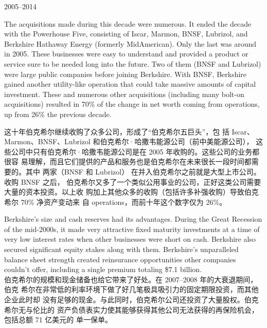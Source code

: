 \begin{section}{2005--2014}
\begin{verseparallel}
  {
    The acquisitions made during this decade were numerous. It ended the decade
    with the Powerhouse Five, consisting of Iscar, Marmon, BNSF, Lubrizol, and
    Berkshire Hathaway Energy (formerly MidAmerican). Only the last was around
    in 2005. These businesses were easy to understand and provided a product or
    service sure to be needed long into the future. Two of them (BNSF and
    Lubrizol) were large public companies before joining Berkshire. With BNSF,
    Berkshire gained another utility-like operation that could take massive
    amounts of capital investment. These and numerous other acquisitions
    (including many bolt-on acquisitions) resulted in 70\% of
    the change in net worth coming from operations, up from 26\% the previous
    decade. \\
  }
  {

    这十年伯克希尔继续收购了众多公司，形成了“伯克希尔五巨头”，包
    括 Iscar、Marmon、BNSF、Lubrizol 和伯克希尔·哈撒韦能源公司（前中美能源公司），
    这些公司中只有伯克希尔·哈撒韦能源公司是在 2005 年收购的。这些公司的业务都很容
    易理解，而且它们提供的产品和服务也是伯克希尔在未来很长一段时间都需要的。其中
    两家（BNSF 和 Lubrizol） 在并入伯克希尔之前就是大型上市公司。收购 BNSF 之后，
    伯克希尔又多了一个类似公用事业的公司，正好这类公司需要大量的资本投资。以上收
    购加上其他众多的收购（包括许多补强收购）导致伯克希尔 70\% 净资产变动来
    自 operations，而前十年这个数字仅为 26\%。

  }
\end{verseparallel}

\begin{verseparallel}
  {
    Berkshire's size and cash reserves had its advantages. During the Great
    Recession of the mid-2000s, it made very attractive fixed maturity
    investments at a time of very low interest rates when other businesses were
    short on cash. Berkshire also secured significant equity stakes along with
    them. Berkshire's unparalleled balance sheet strength created reinsurance
    opportunities other companies couldn't offer, including a single premium
    totaling \$7.1 billion. \\
  }
  {
    伯克希尔的规模和现金储备也给它带来了好处。在 2007--2008 年的大衰退期间，伯克
    希尔在非常低的利率环境下做了好几笔极具吸引力的固定期限投资，而其他企业此时却
    没有足够的现金。与此同时，伯克希尔公司还投资了大量股权。伯克希尔无与伦比的
    资产负债表实力使其能够获得其他公司无法获得的再保险机会，包括总额 71 亿美元的
    单一保单。
  }
\end{verseparallel}
\end{section}

